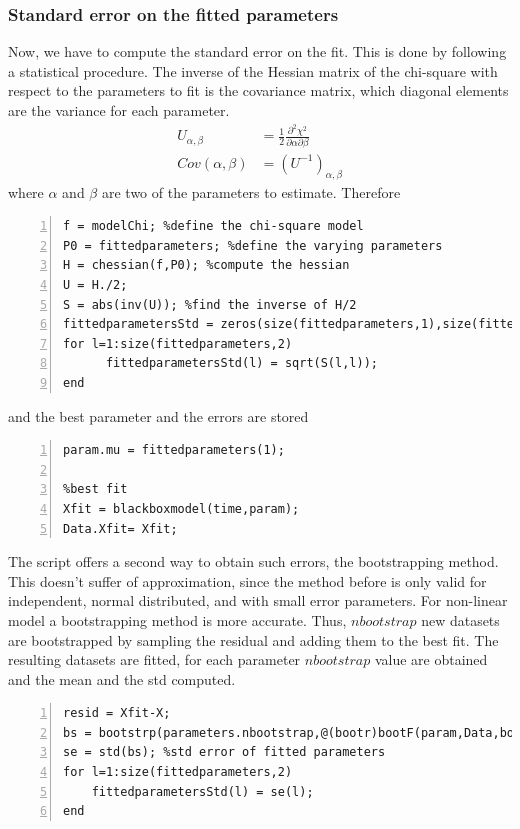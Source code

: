 \documentclass{article}
\begin{document}
\subsubsection{Standard error on the fitted parameters}
Now, we have to compute the standard error on the fit. This is done by following a statistical procedure. The inverse of the Hessian matrix of the chi-square with respect to the parameters to fit is the covariance matrix, which diagonal elements are the variance for each parameter. 
\begin{align}
U_{\alpha, \beta} &= \frac{1}{2} \frac{\partial ^2 \chi ^2 }{\partial \alpha \partial \beta}\\
Cov(\alpha,\beta) &= (U^{-1})_{\alpha, \beta}
\end{align}
where $\alpha$ and $\beta$ are two of the parameters to estimate. Therefore
\begin{lstlisting}[frame=single,numbers=left,style=Matlab-Pyglike]
%compute std of fitted parameters
f = modelChi; %define the chi-square model
P0 = fittedparameters; %define the varying parameters
H = chessian(f,P0); %compute the hessian
U = H./2; 
S = abs(inv(U)); %find the inverse of H/2
fittedparametersStd = zeros(size(fittedparameters,1),size(fittedparameters,2)); %extract the variance on diagonal
for l=1:size(fittedparameters,2)
      fittedparametersStd(l) = sqrt(S(l,l));
end
\end{lstlisting}
and the best parameter and the errors are stored
\begin{lstlisting}[frame=single,numbers=left,style=Matlab-Pyglike]
%best parameters
param.mu = fittedparameters(1);

%best fit
Xfit = blackboxmodel(time,param);
Data.Xfit= Xfit;
\end{lstlisting}
The script offers a second way to obtain such errors, the bootstrapping method. This doesn't suffer of approximation, since the method before is only valid for independent, normal distributed, and with small error parameters. For non-linear model a bootstrapping method is more accurate. Thus, $nbootstrap$ new datasets are bootstrapped by sampling the residual and adding them to the best fit. The resulting datasets are fitted, for each parameter $nbootstrap$ value are obtained and the mean and the std computed. 
\begin{lstlisting}[frame=single,numbers=left,style=Matlab-Pyglike]
%mean, std and ci of paramters (not data!) via bootstrapping
resid = Xfit-X;
bs = bootstrp(parameters.nbootstrap,@(bootr)bootF(param,Data,bootr,blackboxmodel,time,P0,lb,ub,options,m),resid);
se = std(bs); %std error of fitted parameters
for l=1:size(fittedparameters,2)
    fittedparametersStd(l) = se(l);
end
\end{lstlisting}
\end{document}

